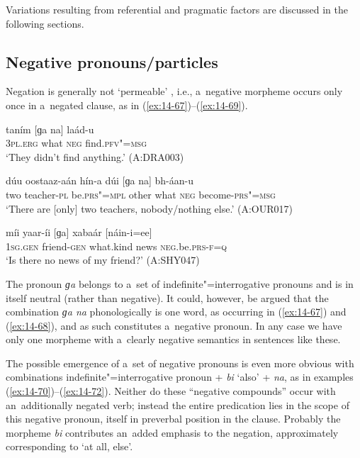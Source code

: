 Variations resulting from referential and pragmatic factors are discussed in the following sections.


\subsection{Negative pronouns/particles}
\label{subsec:14-3-2}

Negation is generally not `permeable' \citep[563]{ramat2006}, i.e., a~negative morpheme occurs only once in a~negated clause, as in (\ref{ex:14-67})--(\ref{ex:14-69}).

\begin{exe}
\ex
\label{ex:14-67}
\gll taním [ɡa na] laád-u \\
\textsc{3pl.erg} what \textsc{neg} find.\textsc{pfv"=msg}  \\
\glt `They didn't find anything.' (A:DRA003)

\ex
\label{ex:14-68}
\gll dúu oostaaz-aán hín-a dúi [ɡa na]  bh-áan-u \\
two teacher-\textsc{pl} be.\textsc{prs"=mpl} other what \textsc{neg}  become-\textsc{prs"=msg} \\
\glt `There are [only] two teachers, nobody/nothing else.' (A:OUR017)

\ex
\label{ex:14-69}
\gll míi yaar-íi [ɡa] xabaár [náin-i=ee] \\
\textsc{1sg.gen} friend-\textsc{gen} what.kind news \textsc{neg}.be.\textsc{prs-f=q}  \\
\glt `Is there no news of my friend?' (A:SHY047)
\end{exe}

The pronoun \textit{ɡa} belongs to a~set of indefinite"=interrogative pronouns and is in itself neutral (rather than negative). It could, however, be argued that the combination \textit{ɡa na} phonologically is one word, as occurring in (\ref{ex:14-67}) and (\ref{ex:14-68}), and as such constitutes a~negative pronoun. In any case we have only one morpheme with a~clearly negative semantics in sentences like these. 



The possible emergence of a~set of negative pronouns is even more obvious with combinations indefinite"=interrogative pronoun + \textit{bi} `also' + \textit{na}, as in examples (\ref{ex:14-70})--(\ref{ex:14-72}). Neither do these ``negative compounds'' occur with an~additionally negated verb; instead the entire predication lies in the scope of this negative pronoun, itself in preverbal position in the clause. Probably the morpheme \textit{bi} contributes an~added emphasis to the negation, approximately corresponding to `at all, else'.

